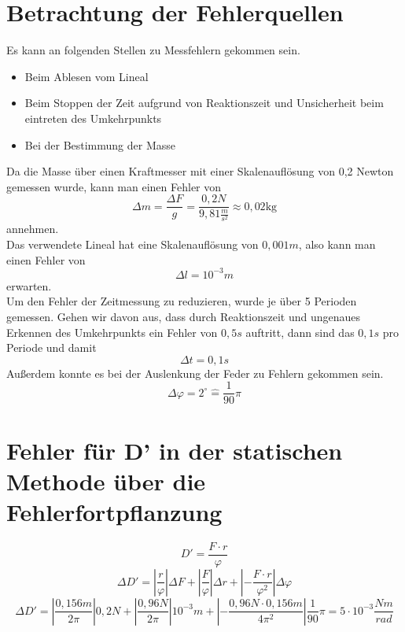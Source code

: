 \documentclass[12pt,a4paper,]{scrreprt}
\let\phi\varphi
\begin{document}
           \section{Betrachtung der Fehlerquellen}
           Es kann an folgenden Stellen zu Messfehlern gekommen sein.
           
\begin{itemize}
\item Beim Ablesen vom Lineal
\item Beim Stoppen der Zeit aufgrund von Reaktionszeit und Unsicherheit beim eintreten des Umkehrpunkts
\item Bei der Bestimmung der Masse
\end{itemize}

Da die Masse über einen Kraftmesser mit einer Skalenauflösung von 0,2 Newton gemessen wurde, kann man einen Fehler von 
 \begin{equation}
 \Delta m = \frac{\Delta F}{g} = \frac{0,2 N}{9,81 \frac{m}{s^2}} \approx 0,02 \si{\kilo\gram} 
 \end{equation}
 annehmen.
\\
Das verwendete Lineal hat eine Skalenauflösung von $0,001m$, also kann man einen Fehler von 
\begin{equation}
	\Delta l = 10^{-3} m
\end{equation}
erwarten.
\\
Um den Fehler der Zeitmessung zu reduzieren, wurde je über 5 Perioden gemessen. Gehen wir davon aus, dass durch Reaktionszeit und ungenaues Erkennen des Umkehrpunkts ein Fehler von $0,5s$ auftritt, dann sind das $0,1s$ pro Periode und damit
\begin{equation}
	\Delta t = 0,1s
\end{equation}
Außerdem konnte es bei der Auslenkung der Feder zu Fehlern gekommen sein.
\begin{equation}
    		\Delta \phi = 2^\circ \hat{=} \frac{1}{90}\pi
    	\end{equation}
	\section{Fehler für D' in der statischen Methode über die Fehlerfortpflanzung}
    	\begin{equation}
    		D' = \frac{F \cdot r}{\phi}
    	\end{equation}
        \begin{equation}
    		\Delta D' = |\frac{r}{\phi}| \Delta F + |\frac{F}{\phi}| \Delta r + |-\frac{F \cdot r}{\phi^2}| \Delta \phi
    	\end{equation}
        \begin{equation}
    		\Delta D' = |\frac{0,156m}{2\pi}| 0,2 N + |\frac{0,96N}{2\pi}| 10^{-3} m + |-\frac{0,96N \cdot 0,156m}{4\pi^2}| \frac{1}{90}\pi = 5\cdot 10^{-3} \frac{Nm}{rad}
    	\end{equation}
\end{document}
